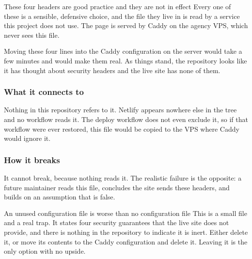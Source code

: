 \begin{keyidea}{These four headers are good practice and they are not in effect}
Every one of these is a sensible, defensive choice, and the file they live in is
read by a service this project does not use. The page is served by Caddy on the
agency VPS, which never sees this file.

Moving these four lines into the Caddy configuration on the server would take a few
minutes and would make them real. As things stand, the repository looks like it has
thought about security headers and the live site has none of them.
\end{keyidea}

\subsubsection*{What it connects to}

Nothing in this repository refers to it. Netlify appears nowhere else in the tree
and no workflow reads it. The deploy workflow does not even exclude it, so if that
workflow were ever restored, this file would be copied to the VPS where Caddy would
ignore it.

\subsubsection*{How it breaks}

It cannot break, because nothing reads it. The realistic failure is the opposite: a
future maintainer reads this file, concludes the site sends these headers, and
builds on an assumption that is false.

\begin{honest}{An unused configuration file is worse than no configuration file}
This is a small file and a real trap. It states four security guarantees that the
live site does not provide, and there is nothing in the repository to indicate it is
inert. Either delete it, or move its contents to the Caddy configuration and delete
it. Leaving it is the only option with no upside.
\end{honest}

